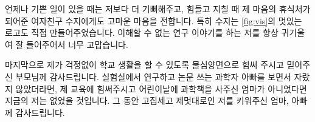 \documentclass[en]{snu-cse-ms-thesis}
\begin{document}
언제나 기쁜 일이 있을 때는 저보다 더 기뻐해주고, 힘들고 지칠 때 제 마음의 휴식처가 되어준 여자친구 수지에게도 고마운 마음을 전합니다.
특히 수지는 \cref{fig:vis}의 멋있는 \Rtrace{} 로고도 직접 만들어주었습니다.
이해할 수 없는 연구 이야기를 하는 저를 항상 귀기울여 잘 들어주어서 너무 고맙습니다.

마지막으로 제가 걱정없이 학교 생활을 할 수 있도록 물심양면으로 힘써 주시고 믿어주신 부모님께 감사드립니다.
실험실에서 연구하고 논문 쓰는 과학자 아빠를 보면서 자랐지 않았더라면, 제 교육에 힘써주시고 어린이날에 과학책을 사주신 엄마가 아니었다면 지금의 저는 없었을 것입니다.
그 동안 고집세고 제멋대로인 저를 키워주신 엄마, 아빠께 감사드립니다.
\end{document}
